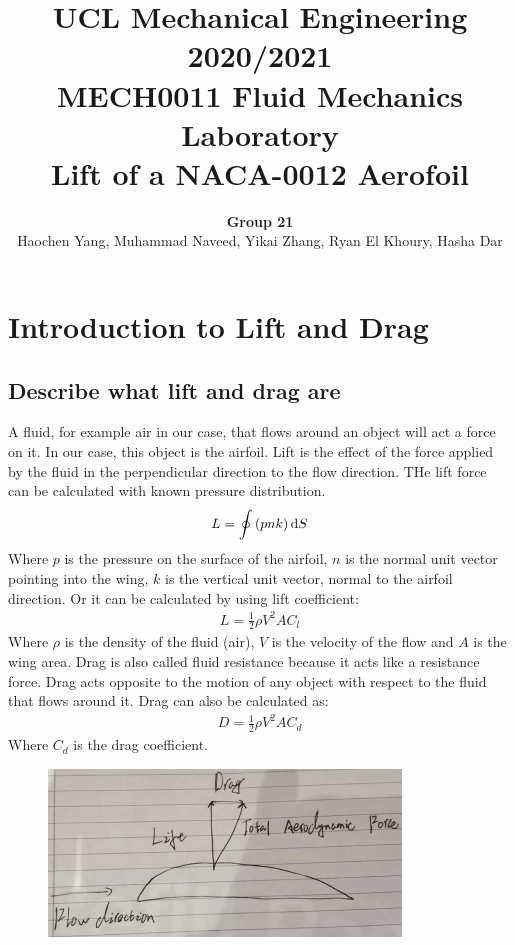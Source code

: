 \documentclass[11pt]{article}
\numberwithin{equation}{section}
\begin{document}
\title{\textbf{UCL Mechanical Engineering 2020/2021}\\MECH0011 Fluid Mechanics Laboratory\\
Lift of a NACA-0012 Aerofoil}
\author{\textbf{Group 21}\\Haochen Yang, Muhammad Naveed, Yikai Zhang, Ryan El Khoury, Hasha Dar}
\maketitle
\section*{Introduction to Lift and Drag}
\subsection*{Describe what lift and drag are}
A fluid, for example air in our case, that flows around an object will act a force on it. In our case, this object is the airfoil. Lift is the effect of the force applied by the fluid in the perpendicular direction to the flow direction. THe lift force can be calculated with known pressure distribution.
\begin{align}
  L = \oint \left(p n k \right)\dif S
\end{align}
Where $p$ is the pressure on the surface of the airfoil, $n$ is the normal unit vector pointing into the wing, $k$ is the vertical unit vector, normal to the airfoil direction. Or it can be calculated by using lift coefficient:
\begin{align}
  L = \frac{1}{2} \rho V^2 A C_l
\end{align}
Where $\rho$ is the density of the fluid (air), $V$ is the velocity of the flow and $A$ is the wing area. Drag is also called fluid resistance because it acts like a resistance force. Drag acts opposite to the motion of any object with respect to the fluid that flows around it. Drag can also be calculated as:
\begin{align}
  D = \frac{1}{2} \rho V^2 A C_d 
\end{align}
Where $C_d$ is the drag coefficient.
\begin{figure}[H]
  \centering
  \includegraphics[width = 0.5 \textwidth]{./img/diagram1.png}
  \caption{}
\end{figure}
\end{document}

